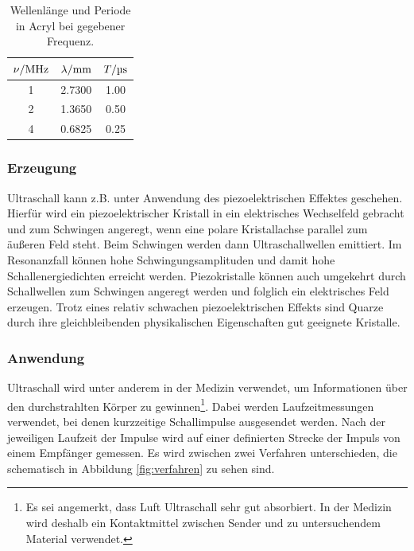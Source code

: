 \begin{table}[H]
    \centering
    \caption{Wellenlänge und Periode in Acryl bei gegebener Frequenz.}
    \label{tab:wellenlaenge-periode}
    \begin{tabular}{S[table-format=1.0] S[table-format=1.4] S[table-format=1.2]}
        \toprule
        {$\nu / \unit[]{\mega\hertz}$} & {$\lambda / \unit[]{\milli\meter}$} & {$T / \unit[]{\micro\second}$} \\
         & 2.7300 & 1.00 \\
        2 & 1.3650 & 0.50 \\
        4 & 0.6825 & 0.25 \\
        \bottomrule
    \end{tabular}
\end{table}
    

\subsubsection{Erzeugung}
Ultraschall kann z.B. unter Anwendung des piezoelektrischen Effektes geschehen.
Hierfür wird ein piezoelektrischer Kristall in ein elektrisches Wechselfeld gebracht und zum Schwingen angeregt, 
wenn eine polare Kristallachse parallel zum äußeren Feld steht.
Beim Schwingen werden dann Ultraschallwellen emittiert.
Im Resonanzfall können hohe Schwingungsamplituden und damit hohe Schallenergiedichten erreicht werden.
Piezokristalle können auch umgekehrt durch Schallwellen zum Schwingen angeregt werden und folglich ein elektrisches Feld erzeugen.
Trotz eines relativ schwachen piezoelektrischen Effekts sind Quarze durch ihre gleichbleibenden physikalischen Eigenschaften
gut geeignete Kristalle.


\subsubsection{Anwendung}
Ultraschall wird unter anderem in der Medizin verwendet, um Informationen über den durchstrahlten Körper zu gewinnen\footnote[2]{Es 
sei angemerkt, dass Luft Ultraschall sehr gut absorbiert.
In der Medizin wird deshalb ein Kontaktmittel zwischen Sender und zu untersuchendem Material verwendet.}.
Dabei werden Laufzeitmessungen verwendet, bei denen kurzzeitige Schallimpulse ausgesendet werden.
Nach der jeweiligen Laufzeit der Impulse wird auf einer definierten Strecke der Impuls von einem Empfänger gemessen.
Es wird zwischen zwei Verfahren unterschieden, die schematisch in Abbildung \ref{fig:verfahren} zu sehen sind.

